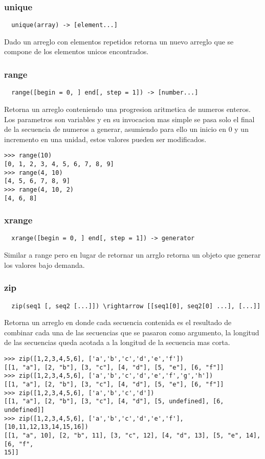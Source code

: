 \subsubsection*{unique}
\begin{verbatim}
  unique(array) -> [element...]
\end{verbatim}
Dado un arreglo con elementos repetidos retorna un nuevo arreglo que se compone de los elementos unicos encontrados.

\subsubsection*{range}
\begin{verbatim}
  range([begin = 0, ] end[, step = 1]) -> [number...]
\end{verbatim}
Retorna un arreglo conteniendo una progresion aritmetica de numeros enteros.
Los parametros son variables y en su invocacion mas simple se pasa solo el final
de la secuencia de numeros a generar, asumiendo para ello un inicio en 0 y un
incremento en una unidad, estos valores pueden ser modificados.
\begin{lstlisting}[style=consola]
>>> range(10)
[0, 1, 2, 3, 4, 5, 6, 7, 8, 9]
>>> range(4, 10)
[4, 5, 6, 7, 8, 9]
>>> range(4, 10, 2)
[4, 6, 8]
\end{lstlisting}

\subsubsection*{xrange}
\begin{verbatim}
  xrange([begin = 0, ] end[, step = 1]) -> generator
\end{verbatim}
Similar a range pero en lugar de retornar un arrglo retorna un objeto que
generar los valores bajo demanda.

\subsubsection*{zip}
\begin{verbatim}
  zip(seq1 [, seq2 [...]]) \rightarrow [[seq1[0], seq2[0] ...], [...]]
\end{verbatim}
Retorna un arreglo en donde cada secuencia contenida es el resultado de combinar
cada una de las secuencias que se pasaron como argumento, la longitud de las
secuencias queda acotada a la longitud de la secuencia mas corta.
\begin{lstlisting}[style=consola]
>>> zip([1,2,3,4,5,6], ['a','b','c','d','e','f'])
[[1, "a"], [2, "b"], [3, "c"], [4, "d"], [5, "e"], [6, "f"]]
>>> zip([1,2,3,4,5,6], ['a','b','c','d','e','f','g','h'])
[[1, "a"], [2, "b"], [3, "c"], [4, "d"], [5, "e"], [6, "f"]]
>>> zip([1,2,3,4,5,6], ['a','b','c','d'])
[[1, "a"], [2, "b"], [3, "c"], [4, "d"], [5, undefined], [6, undefined]]
>>> zip([1,2,3,4,5,6], ['a','b','c','d','e','f'], [10,11,12,13,14,15,16])
[[1, "a", 10], [2, "b", 11], [3, "c", 12], [4, "d", 13], [5, "e", 14], [6, "f",
15]]
\end{lstlisting}

